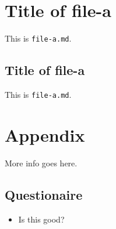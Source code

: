 \hypertarget{title-of-file-a}{%
\section{Title of file-a}\label{title-of-file-a}}

This is \texttt{file-a.md}.

\hypertarget{title-of-file-a}{%
\subsection{Title of file-a}\label{title-of-file-a}}

This is \texttt{file-a.md}.

\hypertarget{appendix}{%
\section{Appendix}\label{appendix}}

More info goes here.

\hypertarget{questionaire}{%
\subsection{Questionaire}\label{questionaire}}

\begin{itemize}
\tightlist
\item
  Is this good?
\end{itemize}
